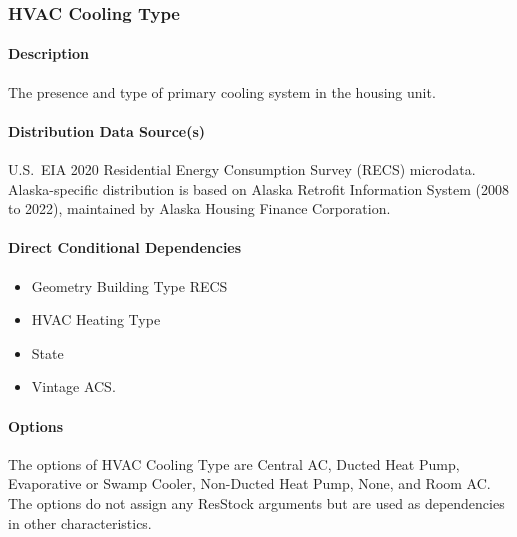 \subsubsection{HVAC Cooling Type}
\paragraph{Description}
The presence and type of primary cooling system in the housing unit.

\paragraph{Distribution Data Source(s)}
U.S.~EIA 2020 Residential Energy Consumption Survey (RECS) microdata. Alaska-specific distribution is based on Alaska Retrofit Information System (2008 to 2022), maintained by Alaska Housing Finance Corporation.

\paragraph{Direct Conditional Dependencies}
\begin{itemize}
    \item Geometry Building Type RECS
    \item HVAC Heating Type
    \item State
    \item Vintage ACS.
\end{itemize}

\paragraph{Options}
The options of HVAC Cooling Type are Central AC, Ducted Heat Pump, Evaporative or Swamp Cooler, Non-Ducted Heat Pump, None, and Room AC. The options do not assign any ResStock arguments but are used as dependencies in other characteristics.

